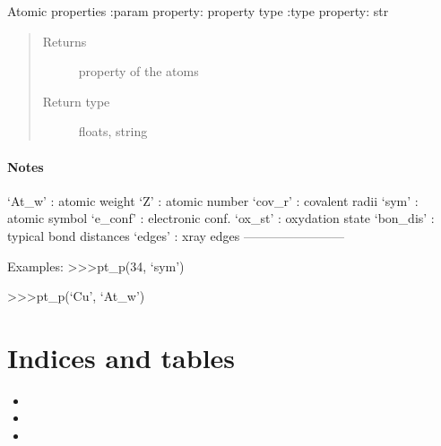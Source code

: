 \documentclass[letterpaper,10pt,english]{sphinxmanual}
\begin{document}
\begin{fulllineitems}
\label{\detokenize{index:TEMpcPlot.pt_p}}
Atomic properties
:param property: property type
:type property: str
\begin{quote}\begin{description}
\item[{Returns}] \leavevmode
property of the atoms

\item[{Return type}] \leavevmode
floats, string

\end{description}\end{quote}
\subsubsection*{Notes}

‘At\_w’    : atomic weight
‘Z’       : atomic number
‘cov\_r’   : covalent radii
‘sym’     : atomic symbol
‘e\_conf’  : electronic conf.
‘ox\_st’   : oxydation state
‘bon\_dis’ : typical bond distances
‘edges’   : x\sphinxhyphen{}ray edges
————————\sphinxhyphen{}

Examples:
\textgreater{}\textgreater{}\textgreater{}pt\_p(34, ‘sym’)

\textgreater{}\textgreater{}\textgreater{}pt\_p(‘Cu’, ‘At\_w’)

\end{fulllineitems}



\chapter{Indices and tables}
\label{\detokenize{index:indices-and-tables}}\begin{itemize}
\item {} 

\item {} 

\item {} 

\end{itemize}


\renewcommand{\indexname}{Python Module Index}
\begin{sphinxtheindex}
\let\bigletter\sphinxstyleindexlettergroup
\bigletter{t}
\item\relax{}
\end{sphinxtheindex}

\renewcommand{\indexname}{Index}
\printindex
\end{document}
